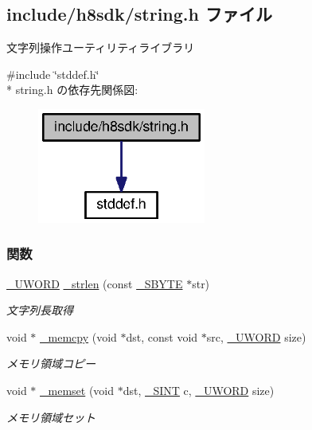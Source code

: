 \subsection{include/h8sdk/string.h ファイル}
\label{string_8h}


文字列操作ユーティリティライブラリ  


{\ttfamily \#include \char`\"{}stddef.\+h\char`\"{}}\\*
string.\+h の依存先関係図\+:
\nopagebreak
\begin{figure}[H]
\begin{center}
\leavevmode
\includegraphics[width=157pt]{db/dfb/string_8h__incl}
\end{center}
\end{figure}
\subsubsection*{関数}
\begin{DoxyCompactItemize}
\item 
\hyperlink{stddef_8h_af4b45f5ec97da370bd2173b4fe891d76_af4b45f5ec97da370bd2173b4fe891d76}{\+\_\+\+U\+W\+O\+R\+D} \hyperlink{string_8h_a801262653a4a3445a4c288d4f3b0e105_a801262653a4a3445a4c288d4f3b0e105}{\+\_\+strlen} (const \hyperlink{stddef_8h_aab65237ca9fbf4192a39cf12dd165942_aab65237ca9fbf4192a39cf12dd165942}{\+\_\+\+S\+B\+Y\+T\+E} $\ast$str)
\begin{DoxyCompactList}\small\item\em 文字列長取得 \end{DoxyCompactList}\item 
void $\ast$ \hyperlink{string_8h_a1203f893f8aa984095f33d0f2eabb67a_a1203f893f8aa984095f33d0f2eabb67a}{\+\_\+memcpy} (void $\ast$dst, const void $\ast$src, \hyperlink{stddef_8h_af4b45f5ec97da370bd2173b4fe891d76_af4b45f5ec97da370bd2173b4fe891d76}{\+\_\+\+U\+W\+O\+R\+D} size)
\begin{DoxyCompactList}\small\item\em メモリ領域コピー \end{DoxyCompactList}\item 
void $\ast$ \hyperlink{string_8h_a63ec32665e0b5cd38f623c412bd2a23c_a63ec32665e0b5cd38f623c412bd2a23c}{\+\_\+memset} (void $\ast$dst, \hyperlink{stddef_8h_aefd1068e35d26c0e7d7079ddf2579174_aefd1068e35d26c0e7d7079ddf2579174}{\+\_\+\+S\+I\+N\+T} c, \hyperlink{stddef_8h_af4b45f5ec97da370bd2173b4fe891d76_af4b45f5ec97da370bd2173b4fe891d76}{\+\_\+\+U\+W\+O\+R\+D} size)
\begin{DoxyCompactList}\small\item\em メモリ領域セット \end{DoxyCompactList}\end{DoxyCompactItemize}


